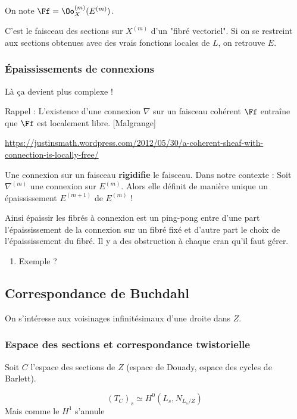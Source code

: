 \documentclass[a4paper]{amsart}
\begin{document}
On note \(\Ff = \Oo_X^{(m)}(E^{(m)})\).

C'est le faisceau des sections sur \(X^{(m)}\) d'un "fibré vectoriel". Si on se restreint aux sections obtenues avec des vrais fonctions locales de \(L\), on retrouve \(E\).


\subsubsection{Épaississements de connexions}
\label{sec:orgf8ca8ec}
Là ça devient plus complexe !

Rappel : L'existence d'une connexion \(\nabla\) sur un faisceau cohérent \(\Ff\) entraîne que \(\Ff\) est localement libre. [Malgrange]

\url{https://justinsmath.wordpress.com/2012/05/30/a-coherent-sheaf-with-connection-is-locally-free/}

Une connexion sur un faisceau \textbf{rigidifie} le faisceau. Dans notre contexte : Soit \(\nabla^{(m)}\) une connexion sur \(E^{(m)}\). Alors elle définit de manière unique un épaississement \(E^{(m+1)}\) de \(E^{(m)}\) !

Ainsi épaissir les fibrés à connexion est un ping-pong entre d’une part l’épaississement de la connexion sur un fibré fixé et d’autre part le choix de l’épaississement du fibré. Il y a des obstruction à chaque cran qu'il faut gérer.

\begin{enumerate}
\item Exemple ?
\label{sec:orgc434f3d}
\end{enumerate}



\subsection{Correspondance de Buchdahl}
\label{sec:orgb622134}

On s'intéresse aux voisinages infinitésimaux d'une droite dans \(Z\). 

\subsubsection{Espace des sections et correspondance twistorielle}
\label{sec:orgee0345b}
Soit \(C\) l'espace des sections de \(Z\) (espace de Douady, espace des cycles de Barlett).

\[
(T_C)_s \simeq H^0(L_s, N_{L_s/Z})
\]
Mais comme le \(H^1\) s'annule
\end{document}
